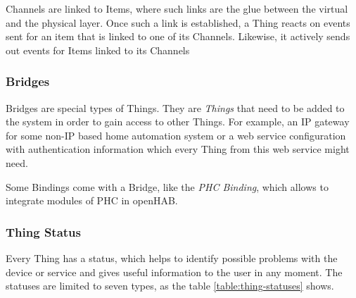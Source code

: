 Channels are linked to Items, where such links are the glue between the virtual and the physical layer. Once such a link is established,
a Thing reacts on events sent for an item that is linked to one of its Channels. Likewise, it actively sends out events for Items linked to its 
Channels

\subsubsection{Bridges}
Bridges are special types of Things. They are \textit{Things} that need to be added to the system in order to gain access to other Things.
For example, an IP gateway for some non-IP based home automation system or a web service configuration with authentication information
which every Thing from this web service might need.

Some Bindings come with a Bridge, like the \textit{PHC Binding}, which allows to integrate modules of PHC in openHAB.\cite{openHABPHCBinding}

\subsubsection{Thing Status}
Every Thing has a status, which helps to identify possible problems with the device or service and gives useful information to the user
in any moment. The statuses are limited to seven types, as the table \ref{table:thing-statuses} shows.

